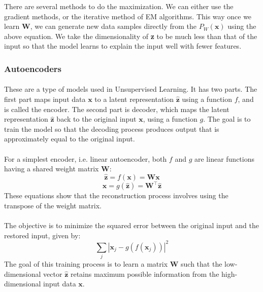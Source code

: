 \documentclass{article}
\begin{document}
            There are several methods to do the maximization. We can either use the gradient methods, or the iterative method of EM algorithms. This way once we learn \textbf{W}, we can generate new data samples directly from the $P_W(\mathbf{x})$ using the above equation. We take the dimensionality of \textbf{z} to be much less than that of the input so that the model learns to explain the input well with fewer features.
    \subsubsection{Autoencoders}
            \paragraph{} These are a type of models used in Unsupervised Learning. It has two parts. The first part maps input data $\mathbf{x}$ to a latent representation $\hat{\mathbf{z}}$ using a function $f$, and is called the encoder. The second part is decoder, which maps the latent representation $\hat{\mathbf{z}}$ back to the original input $\mathbf{x}$, using a function $g$. The goal is to train the model so that the decoding process produces output that is approximately equal to the original input. 
            \paragraph{} For a simplest encoder, i.e. linear autoencoder, both $f$ and $g$ are linear functions having a shared weight matrix $\mathbf{W}$: \begin{equation} \hat{\mathbf{z}} = f(\mathbf{x}) = \mathbf{W}\mathbf{x} \end{equation} \begin{equation} \mathbf{x} = g(\hat{\mathbf{z}}) = \mathbf{W}^\top \hat{\mathbf{z}} \end{equation} These equations show that the reconstruction process involves using the transpose of the weight matrix.
            \paragraph{} The objective is to minimize the squared error between the original input and the restored input, given by: \begin{equation} \sum_{j} \left| \mathbf{x}_j - g(f(\mathbf{x}_j)) \right|^2 \end{equation} The goal of this training process is to learn a matrix $\mathbf{W}$ such that the low-dimensional vector $\hat{\mathbf{z}}$ retains maximum possible information from the high-dimensional input data $\mathbf{x}$. 
   
\end{document}

